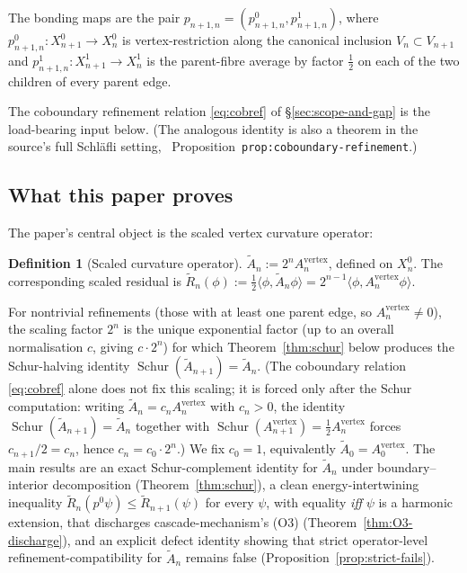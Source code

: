 \documentclass[11pt]{article}
\theoremstyle{plain}
\theoremstyle{definition}
\newtheorem{definition}[theorem]{Definition}
\theoremstyle{remark}
\newcommand{\Schur}{\operatorname{Schur}}
\begin{document}
The bonding maps are the pair
$p_{n+1, n} = (p^{0}_{n+1, n}, p^{1}_{n+1, n})$, where
$p^{0}_{n+1, n} : X_{n+1}^{0} \to X_n^{0}$ is vertex-restriction
along the canonical inclusion $V_n \subset V_{n+1}$ and
$p^{1}_{n+1, n} : X_{n+1}^{1} \to X_n^{1}$ is the parent-fibre
average by factor $\tfrac12$ on each of the two children of every
parent edge.

The coboundary refinement relation \eqref{eq:cobref} of
\S\ref{sec:scope-and-gap} is the load-bearing input below. (The
analogous identity is also a theorem in the source's full
Schl\"{a}fli setting, \cite{CascadeClosureDynamics}~Proposition~\texttt{prop:coboundary-refinement}.)

\subsection{What this paper proves}

The paper's central object is the scaled vertex curvature operator:
\begin{definition}[Scaled curvature operator]\label{def:Atilde}
$\widetilde A_n := 2^n A_n^{\mathrm{vertex}}$, defined on $X_n^{0}$.
The corresponding scaled residual is
$\widetilde R_n(\phi) := \tfrac12 \langle \phi, \widetilde A_n \phi\rangle = 2^{n-1} \langle \phi, A_n^{\mathrm{vertex}} \phi\rangle$.
\end{definition}

For nontrivial refinements (those with at least one parent edge,
so $A_n^{\mathrm{vertex}} \ne 0$), the scaling factor $2^n$ is the
unique exponential factor (up to an overall normalisation $c$,
giving $c \cdot 2^n$) for which Theorem~\ref{thm:schur} below
produces the Schur-halving identity
$\Schur(\widetilde A_{n+1}) = \widetilde A_n$. (The coboundary
relation \eqref{eq:cobref} alone does not fix this scaling; it is
forced only after the Schur computation: writing
$\widetilde A_n = c_n A_n^{\mathrm{vertex}}$ with $c_n > 0$, the
identity $\Schur(\widetilde A_{n+1}) = \widetilde A_n$ together
with $\Schur(A_{n+1}^{\mathrm{vertex}}) = \tfrac12 A_n^{\mathrm{vertex}}$
forces $c_{n+1}/2 = c_n$, hence $c_n = c_0 \cdot 2^n$.) We fix
$c_0 = 1$, equivalently $\widetilde A_0 = A_0^{\mathrm{vertex}}$. The main
results are an exact Schur-complement identity for $\widetilde A_n$
under boundary--interior decomposition (Theorem~\ref{thm:schur}), a
clean energy-intertwining inequality
$\widetilde R_n(p^{0} \psi) \le \widetilde R_{n+1}(\psi)$ for every
$\psi$, with equality \emph{iff} $\psi$ is a harmonic extension,
that discharges cascade-mechanism's (O3)
(Theorem~\ref{thm:O3-discharge}), and an explicit defect identity
showing that strict operator-level refinement-compatibility for
$\widetilde A_n$ remains false (Proposition~\ref{prop:strict-fails}).
\end{document}
